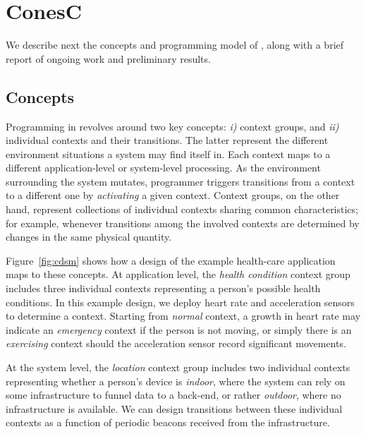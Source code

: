 \section{ConesC}
We describe next the concepts and programming model of \conesc, along
with a brief report of ongoing work and preliminary results.

\subsection{Concepts}

Programming in \conesc revolves around two key concepts: \emph{i)}
context groups, and \emph{ii)} individual contexts and their
transitions. The latter represent the different environment situations
a system may find itself in. Each context maps to a different
application-level or system-level processing. As the environment
surrounding the system mutates, programmer triggers transitions from a
context to a different one by \emph{activating} a given
context. Context groups, on the other hand, represent collections of
individual contexts sharing common characteristics; for example,
whenever transitions among the involved contexts are determined by
changes in the same physical quantity.



Figure~\ref{fig:cdsm} shows how a design of the example health-care
application maps to these concepts. At application level, the
\emph{health condition} context group includes three individual
contexts representing a person's possible health conditions. In this
example design, we deploy heart rate and acceleration sensors to
determine a context. Starting from \emph{normal}
context, a growth in heart rate may indicate an
\emph{emergency} context if the person is not moving, or simply there is an
\emph{exercising} context should the acceleration sensor record significant
movements.

At the system level, the \emph{location} context group
includes two individual contexts representing whether a person's
device is \emph{indoor}, where the system can rely on some
infrastructure to funnel data to a back-end, or rather \emph{outdoor},
where no infrastructure is available. We can design transitions
between these individual contexts as a function of periodic beacons
received from the infrastructure.

